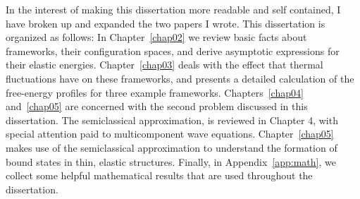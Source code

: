 In the interest of making this dissertation more readable and self contained, I have broken up and expanded the two papers I wrote.
This dissertation is organized as follows:
In Chapter~\ref{chap02} we review basic facts about frameworks, their configuration spaces, and derive asymptotic expressions for their elastic energies.
Chapter~\ref{chap03} deals with the effect that thermal fluctuations have on these frameworks, and presents a detailed calculation of the free-energy profiles for three example frameworks.
Chapters~\ref{chap04} and~\ref{chap05} are concerned with the second problem discussed in this dissertation.
The semiclassical approximation, is reviewed in Chapter 4, with special attention paid to multicomponent wave equations.
Chapter~\ref{chap05} makes use of the semiclassical approximation to understand the formation of bound states in thin, elastic structures.
Finally, in Appendix~\ref{app:math}, we collect some helpful mathematical results that are used throughout the dissertation.
